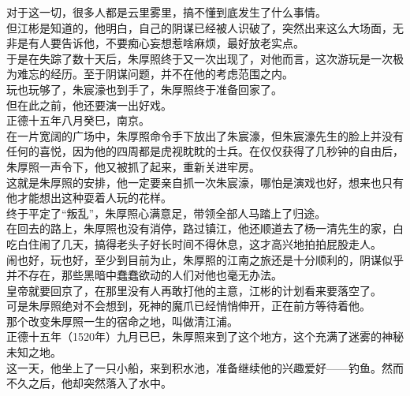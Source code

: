 \begin{multicols}{\theparacolNo}
对于这一切，很多人都是云里雾里，搞不懂到底发生了什么事情。\\

但江彬是知道的，他明白，自己的阴谋已经被人识破了，突然出来这么大场面，无非是有人要告诉他，不要痴心妄想惹啥麻烦，最好放老实点。\\

于是在失踪了数十天后，朱厚照终于又一次出现了，对他而言，这次游玩是一次极为难忘的经历。至于阴谋问题，并不在他的考虑范围之内。\\

玩也玩够了，朱宸濠也到手了，朱厚照终于准备回家了。\\

但在此之前，他还要演一出好戏。\\

正德十五年八月癸巳，南京。\\

在一片宽阔的广场中，朱厚照命令手下放出了朱宸濠，但朱宸濠先生的脸上并没有任何的喜悦，因为他的四周都是虎视眈眈的士兵。在仅仅获得了几秒钟的自由后，朱厚照一声令下，他又被抓了起来，重新关进牢房。\\

这就是朱厚照的安排，他一定要亲自抓一次朱宸濠，哪怕是演戏也好，想来也只有他才能想出这种耍着人玩的花样。\\

终于平定了“叛乱”，朱厚照心满意足，带领全部人马踏上了归途。\\

在回去的路上，朱厚照也没有消停，路过镇江，他还顺道去了杨一清先生的家，白吃白住闹了几天，搞得老头子好长时间不得休息，这才高兴地拍拍屁股走人。\\

闹也好，玩也好，至少到目前为止，朱厚照的江南之旅还是十分顺利的，阴谋似乎并不存在，那些黑暗中蠢蠢欲动的人们对他也毫无办法。\\

皇帝就要回京了，在那里没有人再敢打他的主意，江彬的计划看来要落空了。\\

可是朱厚照绝对不会想到，死神的魔爪已经悄悄伸开，正在前方等待着他。\\

那个改变朱厚照一生的宿命之地，叫做清江浦。\\

正德十五年（1520年）九月已巳，朱厚照来到了这个地方，这个充满了迷雾的神秘未知之地。\\

这一天，他坐上了一只小船，来到积水池，准备继续他的兴趣爱好——钓鱼。然而不久之后，他却突然落入了水中。\\


\end{multicols}
